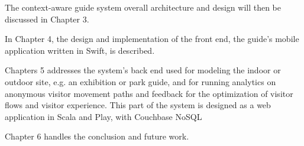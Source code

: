 The context-aware guide system overall architecture and design will then be discussed in Chapter 3.

In Chapter 4, the design and implementation of the front end, the guide's mobile application written in Swift, is described.

Chapters 5 addresses the system's back end used for modeling the indoor or outdoor site, e.g. an exhibition or park guide, and for running analytics on anonymous visitor movement paths and feedback for the optimization of visitor flows and visitor experience. This part of the system is designed as a web application in Scala and Play, with Couchbase NoSQL 

Chapter 6 handles the conclusion and future work. 